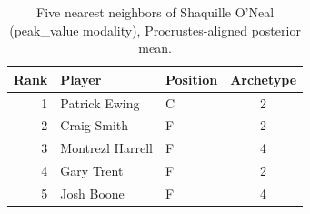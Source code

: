 \begin{table}[htbp]
  \centering\small
  \begin{tabular}{rllc}
    \toprule
    Rank & Player & Position & Archetype \\
    \midrule
    1 & Patrick Ewing & C & 2 \\
    2 & Craig Smith & F & 2 \\
    3 & Montrezl Harrell & F & 4 \\
    4 & Gary Trent & F & 2 \\
    5 & Josh Boone & F & 4 \\
    \bottomrule
  \end{tabular}
  \caption{Five nearest neighbors of Shaquille O'Neal (peak_value modality), Procrustes-aligned posterior mean.}
  \label{tab:Shaquille_O_Neal_neighbors_peak_value}
\end{table}

